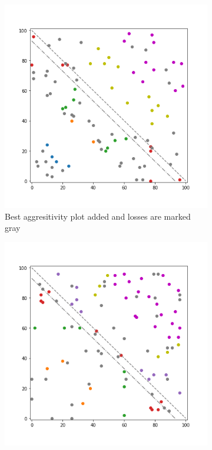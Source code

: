 \begin{figure}[!hb]
\begin{subfigure}{.3\textwidth}
    	\label{fig:25}
	\end{subfigure}%
	\begin{subfigure}{.3\textwidth}%
    	\centering
    	\includegraphics[width=1\linewidth]{Bilder/simulation_3_5}
    	\caption*{Best aggresitivity plot added and losses are marked gray}
    	\label{fig:26}
    \end{subfigure}%
	\begin{subfigure}{.3\textwidth}%
    	\centering
    	\includegraphics[width=1\linewidth]{Bilder/simulation_4_5}
    	\label{fig:27}
	\end{subfigure}
\end{figure}

